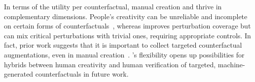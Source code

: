 In terms of the utility per counterfactual, manual creation and \sysname thrive in complementary dimensions. 
People's creativity can be unreliable and incomplete on certain forms of counterfactuals~\cite{ribeiro2018semantically}, whereas \sysname improves perturbation coverage but can mix critical perturbations with trivial ones, requiring appropriate controls.
In fact, prior work suggests that it is important to collect targeted counterfactual augmentations, even in manual creation~\cite{huang2020counterfactually, Khashabi2020MoreBF}.
\sysname's flexibility opens up possibilities for hybrids between human creativity and human verification of targeted, machine-generated counterfactuals in future work.





